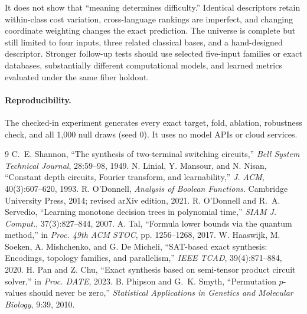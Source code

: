 \documentclass[10pt]{article}
\theoremstyle{definition}
\begin{document}
It does not show that ``meaning determines difficulty.''  Identical
descriptors retain within-class cost variation, cross-language rankings are
imperfect, and changing coordinate weighting changes the exact prediction.
The universe is complete but still limited to four inputs, three related
classical bases, and a hand-designed descriptor.  Stronger follow-up tests
should use selected five-input families or exact databases, substantially
different computational models, and learned metrics evaluated under the same
fiber holdout.

\paragraph{Reproducibility.}
The checked-in experiment generates every exact target, fold, ablation,
robustness check, and all 1,000 null draws (seed 0).  It uses no model APIs or
cloud services.

\begingroup
\footnotesize
\setlength{\parskip}{0pt}
\begin{thebibliography}{9}
\setlength{\itemsep}{0pt}
C.~E. Shannon, ``The synthesis of two-terminal switching circuits,''
\emph{Bell System Technical Journal}, 28:59--98, 1949.
N. Linial, Y. Mansour, and N. Nisan, ``Constant depth circuits, Fourier
transform, and learnability,'' \emph{J. ACM}, 40(3):607--620, 1993.
R. O'Donnell, \emph{Analysis of Boolean Functions}. Cambridge University
Press, 2014; revised arXiv edition, 2021.
R. O'Donnell and R.~A. Servedio, ``Learning monotone decision trees in
polynomial time,'' \emph{SIAM J. Comput.}, 37(3):827--844, 2007.
A. Tal, ``Formula lower bounds via the quantum method,'' in \emph{Proc. 49th
ACM STOC}, pp. 1256--1268, 2017.
W. Haaswijk, M. Soeken, A. Mishchenko, and G. De Micheli, ``SAT-based exact
synthesis: Encodings, topology families, and parallelism,'' \emph{IEEE TCAD},
39(4):871--884, 2020.
H. Pan and Z. Chu, ``Exact synthesis based on semi-tensor product circuit
solver,'' in \emph{Proc. DATE}, 2023.
B. Phipson and G.~K. Smyth, ``Permutation $p$-values should never be zero,''
\emph{Statistical Applications in Genetics and Molecular Biology}, 9:39, 2010.
\end{thebibliography}
\endgroup
\end{document}
